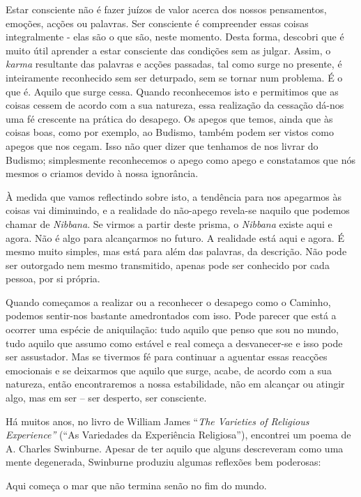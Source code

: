 Estar consciente não é fazer juízos de valor acerca dos nossos
pensamentos, emoções, acções ou palavras. Ser consciente é compreender
essas coisas integralmente - elas são o que são, neste momento. Desta
forma, descobri que é muito útil aprender a estar consciente das
condições sem as julgar. Assim, o \emph{karma} resultante das palavras e
acções passadas, tal como surge no presente, é inteiramente reconhecido
sem ser deturpado, sem se tornar num problema. É o que é. Aquilo que
surge cessa. Quando reconhecemos isto e permitimos que as coisas cessem
de acordo com a sua natureza, essa realização da cessação dá-nos uma fé
crescente na prática do desapego. Os apegos que temos, ainda que às
coisas boas, como por exemplo, ao Budismo, também podem ser vistos como
apegos que nos cegam. Isso não quer dizer que tenhamos de nos livrar do
Budismo; simplesmente reconhecemos o apego como apego e constatamos que
nós mesmos o criamos devido à nossa ignorância.

À medida que vamos reflectindo sobre isto, a tendência para nos
apegarmos às coisas vai diminuindo, e a realidade do não-apego revela-se
naquilo que podemos chamar de \emph{Nibbana}. Se virmos a partir deste
prisma, o \emph{Nibbana} existe aqui e agora. Não é algo para
alcançarmos no futuro. A realidade está aqui e agora. É mesmo muito
simples, mas está para além das palavras, da descrição. Não pode ser
outorgado nem mesmo transmitido, apenas pode ser conhecido por cada
pessoa, por si própria.

Quando começamos a realizar ou a reconhecer o desapego como o Caminho,
podemos sentir-nos bastante amedrontados com isso. Pode parecer que está
a ocorrer uma espécie de aniquilação: tudo aquilo que penso que sou no
mundo, tudo aquilo que assumo como estável e real começa a desvanecer-se
e isso pode ser assustador. Mas se tivermos fé para continuar a aguentar
essas reacções emocionais e se deixarmos que aquilo que surge, acabe, de
acordo com a sua natureza, então encontraremos a nossa estabilidade, não
em alcançar ou atingir algo, mas em ser -- ser desperto, ser consciente.

Há muitos anos, no livro de William James ``\emph{The Varieties of
Religious} \emph{Experience''} (``As Variedades da Experiência
Religiosa''), encontrei um poema de A. Charles Swinburne. Apesar de ter
aquilo que alguns descreveram como uma mente degenerada, Swinburne
produziu algumas reflexões bem poderosas:

Aqui começa o mar que não termina senão no fim do mundo.

